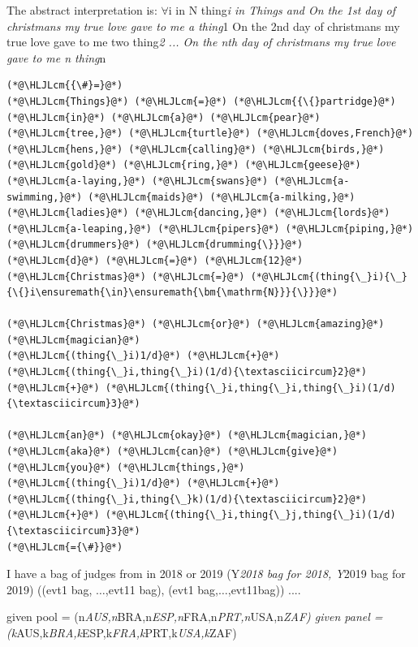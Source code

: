 \documentclass[12pt,a4paper]{article}
\newcommand{\HLJLcm}[1]{\textcolor[RGB]{153,153,119}{\textit{#1}}}
\begin{document}
The abstract interpretation is: \ensuremath{\forall}i in N thing\emph{i in Things and On the 1st day of christmans my true love gave to me a thing}1 On the 2nd day of christmans my true love gave to me two thing\emph{2 ... On the nth day of christmans my true love gave to me n thing}n


\begin{lstlisting}
(*@\HLJLcm{{\#}=}@*)
(*@\HLJLcm{Things}@*) (*@\HLJLcm{=}@*) (*@\HLJLcm{{\{}partridge}@*) (*@\HLJLcm{in}@*) (*@\HLJLcm{a}@*) (*@\HLJLcm{pear}@*) (*@\HLJLcm{tree,}@*) (*@\HLJLcm{turtle}@*) (*@\HLJLcm{doves,French}@*) (*@\HLJLcm{hens,}@*) (*@\HLJLcm{calling}@*) (*@\HLJLcm{birds,}@*) (*@\HLJLcm{gold}@*) (*@\HLJLcm{ring,}@*) (*@\HLJLcm{geese}@*) (*@\HLJLcm{a-laying,}@*) (*@\HLJLcm{swans}@*) (*@\HLJLcm{a-swimming,}@*) (*@\HLJLcm{maids}@*) (*@\HLJLcm{a-milking,}@*) (*@\HLJLcm{ladies}@*) (*@\HLJLcm{dancing,}@*) (*@\HLJLcm{lords}@*) (*@\HLJLcm{a-leaping,}@*) (*@\HLJLcm{pipers}@*) (*@\HLJLcm{piping,}@*) (*@\HLJLcm{drummers}@*) (*@\HLJLcm{drumming{\}}}@*)
(*@\HLJLcm{d}@*) (*@\HLJLcm{=}@*) (*@\HLJLcm{12}@*)
(*@\HLJLcm{Christmas}@*) (*@\HLJLcm{=}@*) (*@\HLJLcm{(thing{\_}i){\_}{\{}i\ensuremath{\in}\ensuremath{\bm{\mathrm{N}}}{\}}}@*)

(*@\HLJLcm{Christmas}@*) (*@\HLJLcm{or}@*) (*@\HLJLcm{amazing}@*) (*@\HLJLcm{magician}@*) 
(*@\HLJLcm{(thing{\_}i)1/d}@*) (*@\HLJLcm{+}@*) (*@\HLJLcm{(thing{\_}i,thing{\_}i)(1/d){\textasciicircum}2}@*) (*@\HLJLcm{+}@*) (*@\HLJLcm{(thing{\_}i,thing{\_}i,thing{\_}i)(1/d){\textasciicircum}3}@*)

(*@\HLJLcm{an}@*) (*@\HLJLcm{okay}@*) (*@\HLJLcm{magician,}@*) (*@\HLJLcm{aka}@*) (*@\HLJLcm{can}@*) (*@\HLJLcm{give}@*) (*@\HLJLcm{you}@*) (*@\HLJLcm{things,}@*) 
(*@\HLJLcm{(thing{\_}i)1/d}@*) (*@\HLJLcm{+}@*) (*@\HLJLcm{(thing{\_}i,thing{\_}k)(1/d){\textasciicircum}2}@*) (*@\HLJLcm{+}@*) (*@\HLJLcm{(thing{\_}i,thing{\_}j,thing{\_}i)(1/d){\textasciicircum}3}@*)
(*@\HLJLcm{={\#}}@*)
\end{lstlisting}


I have a bag of judges from in 2018 or 2019 (Y\emph{2018 bag for 2018, Y}2019 bag for 2019) ((evt1 bag, \ensuremath{\ldots},evt11 bag), (evt1 bag,\ensuremath{\ldots},evt11bag)) ....


given pool = (n\emph{AUS,n}BRA,n\emph{ESP,n}FRA,n\emph{PRT,n}USA,n\emph{ZAF) given panel = (k}AUS,k\emph{BRA,k}ESP,k\emph{FRA,k}PRT,k\emph{USA,k}ZAF)
\end{document}
